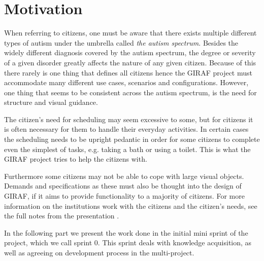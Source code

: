 \section{Motivation}
When referring to citizens, one must be aware that there exists multiple different types of autism under the umbrella called \textit{the autism spectrum}.
Besides the widely different diagnosis covered by the autism spectrum, the degree or severity of a given disorder greatly affects the nature of any given citizen.
Because of this there rarely is one thing that defines all citizens hence the GIRAF project must accommodate many different use cases, scenarios and configurations.
However, one thing that seems to be consistent across the autism spectrum, is the need for structure and visual guidance.

The citizen's need for scheduling may seem excessive to some, but for citizens it is often necessary for them to handle their everyday activities.
In certain cases the scheduling needs to be upright pedantic in order for some citizens to complete even the simplest of tasks, e.g. taking a bath or using a toilet.
This is what the GIRAF project tries to help the citizens with.

Furthermore some citizens may not be able to cope with large visual objects.
Demands and specifications as these must also be thought into the design of GIRAF, if it aims to provide functionality to a majority of citizens.
For more information on the institutions work with the citizens and the citizen's needs, see the full notes from the presentation \cite{GIRAF20161stMeeting}.

In the following part we present the work done in the initial mini sprint of the project, which we call sprint 0.
This sprint deals with knowledge acquisition, as well as agreeing on development process in the multi-project.

